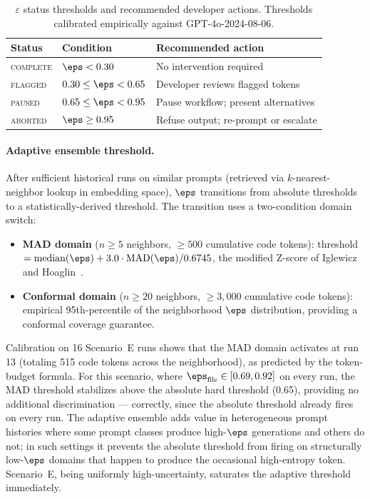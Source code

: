 \begin{table}[h]
\centering
\caption{$\varepsilon$ status thresholds and recommended developer actions.
         Thresholds calibrated empirically against GPT-4o-2024-08-06.}
\label{tab:thresholds}
\begin{tabular}{llp{5.5cm}}
\toprule
\textbf{Status} & \textbf{Condition} & \textbf{Recommended action} \\
\midrule
\textsc{complete} & $\eps < 0.30$ & No intervention required \\
\textsc{flagged}  & $0.30 \leq \eps < 0.65$ & Developer reviews flagged tokens \\
\textsc{paused}   & $0.65 \leq \eps < 0.95$ & Pause workflow; present alternatives \\
\textsc{aborted}  & $\eps \geq 0.95$ & Refuse output; re-prompt or escalate \\
\bottomrule
\end{tabular}
\end{table}

\paragraph{Adaptive ensemble threshold.}
After sufficient historical runs on similar prompts (retrieved via
$k$-nearest-neighbor lookup in embedding space), $\eps$ transitions from
absolute thresholds to a statistically-derived threshold. The transition uses
a two-condition domain switch:

\begin{itemize}[noitemsep]
  \item \textbf{MAD domain} ($n \geq 5$ neighbors, $\geq 500$ cumulative code tokens):
    threshold $= \text{median}(\eps) + 3.0 \cdot \text{MAD}(\eps) / 0.6745$,
    the modified Z-score of Iglewicz and Hoaglin~\cite{iglewicz1993detect}.
  \item \textbf{Conformal domain} ($n \geq 20$ neighbors, $\geq 3{,}000$ cumulative
    code tokens): empirical 95th-percentile of the neighborhood $\eps$
    distribution, providing a conformal coverage guarantee.
\end{itemize}

Calibration on 16 Scenario~E runs shows that the MAD domain activates at
run 13 (totaling 515 code tokens across the neighborhood), as predicted by
the token-budget formula. For this scenario, where $\eps_\text{file} \in
[0.69, 0.92]$ on every run, the MAD threshold stabilizes above the absolute
hard threshold (0.65), providing no additional discrimination --- correctly,
since the absolute threshold already fires on every run. The adaptive
ensemble adds value in heterogeneous prompt histories where some prompt
classes produce high-$\eps$ generations and others do not; in such settings
it prevents the absolute threshold from firing on structurally low-$\eps$
domains that happen to produce the occasional high-entropy token.
Scenario~E, being uniformly high-uncertainty, saturates the adaptive
threshold immediately.
